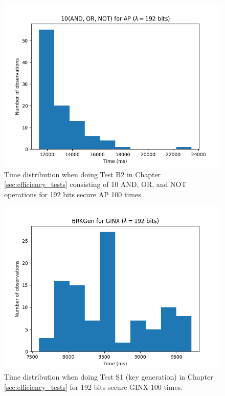 \begin{figure}[ht]
    \centering
    \includegraphics[width=0.8\linewidth]{data/figures/AP_STD192_10AND_OR_NOT.png}
    \caption{Time distribution when doing Test B2 in Chapter \ref{sec:efficiency_tests} consisting of 10 AND, OR, and NOT operations for 192 bits secure AP 100 times.}
    \label{fig:distr_ap192_10}
\end{figure}

\begin{figure}[ht]
    \centering
    \includegraphics[width=0.8\linewidth]{data/figures/GINX_STD192_BRKGen.png}
    \caption{Time distribution when doing Test S1 (key generation) in Chapter \ref{sec:efficiency_tests} for 192 bits secure GINX 100 times.}
    \label{fig:distr_ginx192_keygen}
\end{figure}

